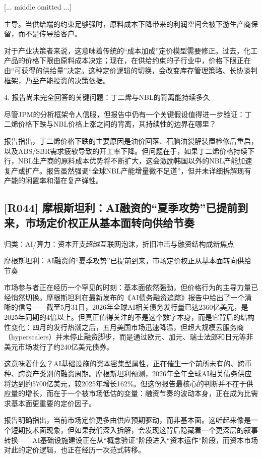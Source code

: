 \documentclass[11pt]{ctexart}
\begin{document}
[... middle omitted ...]

主导。当供给端的约束足够强时，原料成本下降带来的利润空间会被下游生产商保留，而不是传导给客户。

对于产业决策者来说，这意味着传统的“成本加成”定价模型需要修正。过去，化工产品的价格下限由原料成本决定；现在，在供给约束的子行业中，价格下限正在由“可获得的供给量”决定。这种定价逻辑的切换，会改变库存管理策略、长协谈判框架，乃至产能投资的决策依据。

4. 报告尚未完全回答的关键问题：丁二烯与NBL的背离能持续多久

尽管JPM的分析框架令人信服，但报告中仍有一个关键假设值得进一步验证：丁二烯价格下跌与NBL价格上涨之间的背离，其持续性的边界在哪里？

报告指出，丁二烯价格下跌的主要原因是油价回落、石脑油裂解装置检修后重启，以及ABS/SBR需求疲软导致的开工率下降。但问题在于，如果丁二烯价格持续下行，NBL生产商的原料成本优势将不断扩大，这会激励韩国以外的NBL产能加速复产或扩产。报告虽然强调“全球NBL产能增量微不足道”，但并未详细拆解现有产能的闲置率和潜在复产弹性。

\subsection{[R044] 摩根斯坦利：AI融资的“夏季攻势”已提前到来，市场定价权正从基本面转向供给节奏}
{\small\color{refgray}归类：AI/算力：资本开支超越互联网泡沫，折旧冲击与融资结构成新焦点}

摩根斯坦利：AI融资的“夏季攻势”已提前到来，市场定价权正从基本面转向供给节奏

市场参与者正在经历一个罕见的时刻：基本面依然强劲，但价格行为的主导力量已经悄然切换。摩根斯坦利在最新发布的《AI债务融资追踪》报告中给出了一个清晰的信号——截至5月31日，2026年全球AI相关债务发行量已达2360亿美元，是2025年同期的4倍以上。但真正值得关注的不是这个数字本身，而是它背后的结构性变化：四月的发行热潮之后，五月美国市场迅速降温，但超大规模云服务商（hyperscalers）并未停止融资脚步，而是通过欧元、加元、瑞士法郎和日元等非美元市场发行了约240亿美元债券。

这意味着什么？AI基础设施的资本密集型属性，正在催生一个前所未有的、跨币种、跨资产类别的融资周期。摩根斯坦利预测，2026年全年全球AI相关债务供应将达到约5700亿美元，较2025年增长162\%。但这份报告最核心的判断并不在于供应量的增长，而在于一个被市场低估的变量：融资节奏的波动本身，正在成为比需求基本面更重要的定价因子。

报告明确指出，当前市场定价更多由供应预期驱动，而非基本面。这听起来像是一个短期技术面现象，但如果我们深入拆解，会发现这背后隐藏着一个更深层的叙事转换——AI基础设施建设正在从“概念验证”阶段进入“资本运作”阶段，而资本市场对此的定价逻辑，也正在经历一次范式转移。
\end{document}

